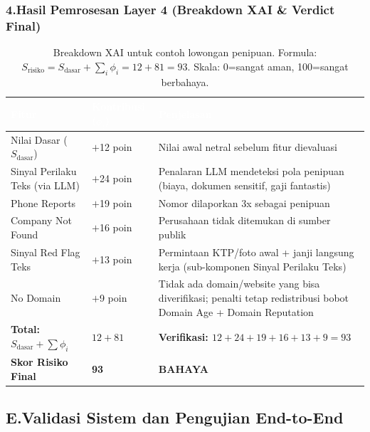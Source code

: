 \documentclass[12pt,a4paper]{article}
\newcommand{\thead}[1]{\textcolor{white}{\textbf{#1}}}
\begin{document}
\subsubsection*{4.\quad Hasil Pemrosesan Layer 4 (Breakdown XAI \& Verdict Final)}

\begin{adjustwidth}{1.45cm}{0pt}
\begin{table}[H]
\centering
\caption{Breakdown XAI untuk contoh lowongan penipuan. Formula: $S_{\text{risiko}} = S_{\text{dasar}} + \sum_i \phi_i = 12 + 81 = 93$. Skala: 0=sangat aman, 100=sangat berbahaya.}
\label{tab:xai-example-breakdown}
\small
\begin{tabularx}{\linewidth}{@{}p{4.2cm}p{2.2cm}Y@{}}
\toprule
{}\thead{Fitur} & \thead{Kontribusi ($\phi_i$)} & \thead{Penjelasan} \\
\midrule
Nilai Dasar ($S_{\text{dasar}}$) & $+$12 poin & Nilai awal netral sebelum fitur dievaluasi \\
Sinyal Perilaku Teks (via LLM) & $+$24 poin & Penalaran LLM mendeteksi pola penipuan (biaya, dokumen sensitif, gaji fantastis) \\
Phone Reports & $+$19 poin & Nomor dilaporkan 3x sebagai penipuan \\
Company Not Found & $+$16 poin & Perusahaan tidak ditemukan di sumber publik \\
Sinyal Red Flag Teks & $+$13 poin & Permintaan KTP/foto awal + janji langsung kerja (sub-komponen Sinyal Perilaku Teks) \\
No Domain & $+$9 poin & Tidak ada domain/website yang bisa diverifikasi; penalti tetap redistribusi bobot Domain Age + Domain Reputation \\
\midrule
\textbf{Total: $S_{\text{dasar}} + \sum\phi_i$} & \textbf{$12 + 81$} & \textbf{Verifikasi: $12 + 24 + 19 + 16 + 13 + 9 = 93$} \\
\midrule
\textbf{Skor Risiko Final} & \textbf{93} & \textbf{BAHAYA} \\
\bottomrule
\end{tabularx}
\end{table}
\end{adjustwidth}

\subsection*{E.\quad Validasi Sistem dan Pengujian End-to-End}
\end{document}
